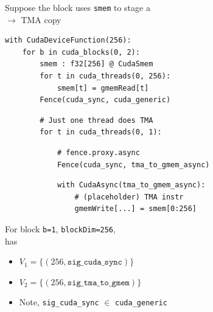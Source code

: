 \begin{minipage}[t]{0.55\textwidth}
\end{minipage}
\newpage
{}

\begin{minipage}[t]{0.55\textwidth}\fixminipage
Suppose the block uses \texttt{smem} to stage a\\
$\to$ TMA copy

\begin{verbatim}
with CudaDeviceFunction(256):
    for b in cuda_blocks(0, 2):
        smem : f32[256] @ CudaSmem
        for t in cuda_threads(0, 256):
            smem[t] = gmemRead[t]
        Fence(cuda_sync, cuda_generic)

\end{verbatim}
\begin{mdframed}[style=MyFrame, backgroundcolor=greenBoxBg]
\color{greenBoxFg}
\begin{verbatim}
        # Just one thread does TMA
        for t in cuda_threads(0, 1):
\end{verbatim}
\end{mdframed}
\begin{mdframed}[style=MyFrame, backgroundcolor=violetBoxBg]
\color{violetBoxFg}
\begin{verbatim}
            # fence.proxy.async
            Fence(cuda_sync, tma_to_gmem_async)
\end{verbatim}
\end{mdframed}
\begin{mdframed}[style=MyFrame, backgroundcolor=greenBoxBg]
\color{greenBoxFg}
\begin{verbatim}
            with CudaAsync(tma_to_gmem_async):
                # (placeholder) TMA instr
                gmemWrite[...] = smem[0:256]
\end{verbatim}
\end{mdframed}

For block \texttt{b=1}, \texttt{blockDim=256},\\
 has
\begin{itemize}
  \item $V_1 = \{(256, \texttt{sig\_cuda\_sync})\}$
  \item $V_2 = \{(256, \texttt{sig\_tma\_to\_gmem})\}$
  \item Note, \texttt{sig\_cuda\_sync} $\in$ \texttt{cuda\_generic}
\end{itemize}
\end{minipage}
